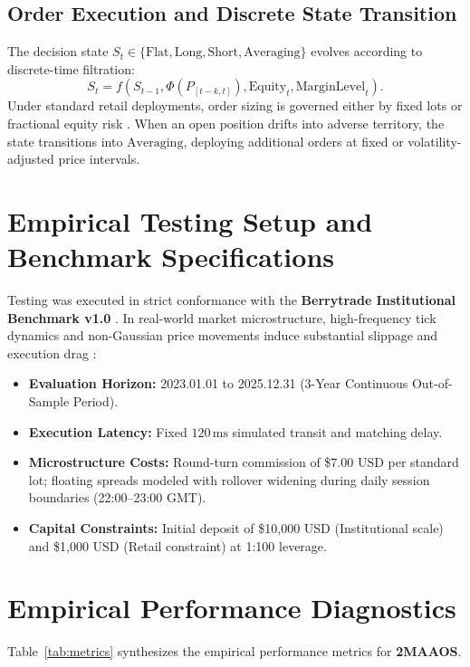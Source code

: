\documentclass[11pt,a4paper]{article}
\begin{document}
\subsection{Order Execution and Discrete State Transition}
The decision state $S_t \in \{\text{Flat}, \text{Long}, \text{Short}, \text{Averaging}\}$ evolves according to discrete-time filtration:
\begin{equation}
S_{t} = f(S_{t-1}, \Phi(P_{[t-k, t]}), \text{Equity}_t, \text{MarginLevel}_t).
\end{equation}
Under standard retail deployments, order sizing is governed either by fixed lots or fractional equity risk \cite{lopez2018advances, carhart1997persistence}. When an open position drifts into adverse territory, the state transitions into $\text{Averaging}$, deploying additional orders at fixed or volatility-adjusted price intervals.

\section{Empirical Testing Setup and Benchmark Specifications}
Testing was executed in strict conformance with the \textbf{Berrytrade Institutional Benchmark v1.0} \cite{artsu2026illusion}. In real-world market microstructure, high-frequency tick dynamics and non-Gaussian price movements induce substantial slippage and execution drag \cite{kyle1985continuous, amihud2002illiquidity, cont2001empirical, mandelbrot1963variation}:
\begin{itemize}
    \item \textbf{Evaluation Horizon:} 2023.01.01 to 2025.12.31 (3-Year Continuous Out-of-Sample Period).
    \item \textbf{Execution Latency:} Fixed $120\,\text{ms}$ simulated transit and matching delay.
    \item \textbf{Microstructure Costs:} Round-turn commission of \$7.00 USD per standard lot; floating spreads modeled with rollover widening during daily session boundaries (22:00--23:00 GMT).
    \item \textbf{Capital Constraints:} Initial deposit of \$10,000 USD (Institutional scale) and \$1,000 USD (Retail constraint) at 1:100 leverage.
\end{itemize}

\section{Empirical Performance Diagnostics}
Table~\ref{tab:metrics} synthesizes the empirical performance metrics for \textbf{2MAAOS}.
\end{document}
